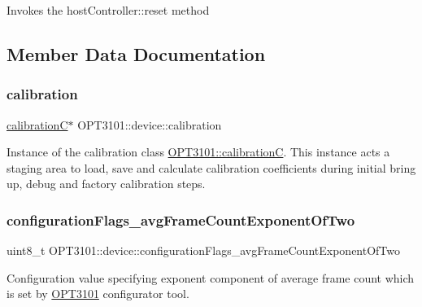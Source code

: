 \begin{DoxyItemize}
\item Invokes the host\+Controller\+::reset method 
\end{DoxyItemize}

\subsection{Member Data Documentation}
\mbox{\label{class_o_p_t3101_1_1device_a808c6e99f30fc4f21bee018f351f560d}} 
\subsubsection{\texorpdfstring{calibration}{calibration}}
{\footnotesize\ttfamily \mbox{\hyperlink{class_o_p_t3101_1_1calibration_c}{calibrationC}}$\ast$ O\+P\+T3101\+::device\+::calibration}



Instance of the calibration class \mbox{\hyperlink{class_o_p_t3101_1_1calibration_c}{O\+P\+T3101\+::calibrationC}}. This instance acts a staging area to load, save and calculate calibration coefficients during initial bring up, debug and factory calibration steps. 

\mbox{\label{class_o_p_t3101_1_1device_aa2216815a45a5641629331b10fd1ba2e}} 
\subsubsection{\texorpdfstring{configuration\+Flags\+\_\+avg\+Frame\+Count\+Exponent\+Of\+Two}{configurationFlags\_avgFrameCountExponentOfTwo}}
{\footnotesize\ttfamily uint8\+\_\+t O\+P\+T3101\+::device\+::configuration\+Flags\+\_\+avg\+Frame\+Count\+Exponent\+Of\+Two}



Configuration value specifying exponent component of average frame count which is set by \mbox{\hyperlink{namespace_o_p_t3101}{O\+P\+T3101}} configurator tool. 

